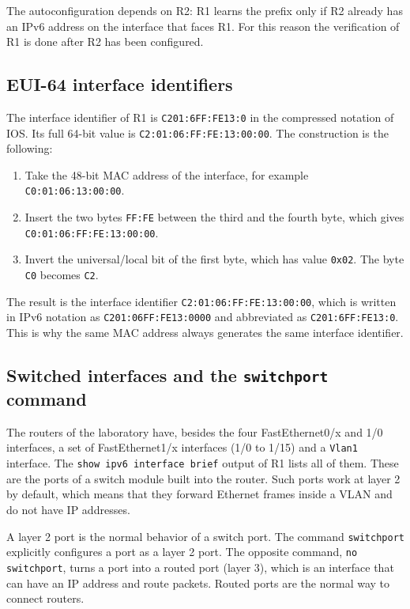 The autoconfiguration depends on R2: R1 learns the prefix only if R2 already has an IPv6 address on the interface that faces R1. For this reason the verification of R1 is done after R2 has been configured.

\subsection{EUI-64 interface identifiers}
\label{sec:lab01-eui64}

The interface identifier of R1 is \texttt{C201:6FF:FE13:0} in the compressed notation of IOS. Its full 64-bit value is \texttt{C2:01:06:FF:FE:13:00:00}. The construction is the following:

\begin{enumerate}
\item Take the 48-bit MAC address of the interface, for example \texttt{C0:01:06:13:00:00}.
\item Insert the two bytes \texttt{FF:FE} between the third and the fourth byte, which gives \texttt{C0:01:06:FF:FE:13:00:00}.
\item Invert the universal/local bit of the first byte, which has value \texttt{0x02}. The byte \texttt{C0} becomes \texttt{C2}.
\end{enumerate}

The result is the interface identifier \texttt{C2:01:06:FF:FE:13:00:00}, which is written in IPv6 notation as \texttt{C201:06FF:FE13:0000} and abbreviated as \texttt{C201:6FF:FE13:0}. This is why the same MAC address always generates the same interface identifier.

\subsection{Switched interfaces and the \texttt{switchport} command}
\label{sec:lab01-switchport}

The routers of the laboratory have, besides the four FastEthernet0/x and 1/0 interfaces, a set of FastEthernet1/x interfaces (1/0 to 1/15) and a \texttt{Vlan1} interface. The \texttt{show ipv6 interface brief} output of R1 lists all of them. These are the ports of a switch module built into the router. Such ports work at layer 2 by default, which means that they forward Ethernet frames inside a VLAN and do not have IP addresses.

A layer 2 port is the normal behavior of a switch port. The command \texttt{switchport} explicitly configures a port as a layer 2 port. The opposite command, \texttt{no switchport}, turns a port into a routed port (layer 3), which is an interface that can have an IP address and route packets. Routed ports are the normal way to connect routers.

